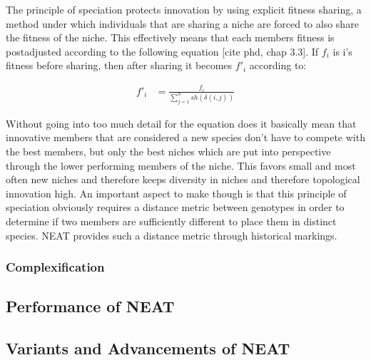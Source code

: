\documentclass[journal, a4paper]{IEEEtran}
\begin{document}
The principle of speciation protects innovation by using explicit fitness sharing, a method under which individuals that are sharing a niche are forced to also share the fitness of the niche. This effectively means that each members fitness is postadjusted according to the following equation [cite phd, chap 3.3]. If $f_i$ is i's fitness before sharing, then after sharing it becomes $f'_i$ according to:

\begin{align}
    f'_i &= \frac{f_i}{\sum_{j=1}^{n} sh(\delta(i,j))}
\end{align}

Without going into too much detail for the equation does it basically mean that innovative members that are considered a new species don't have to compete with the best members, but only the best niches which are put into perspective through the lower performing members of the niche. This favors small and most often new niches and therefore keeps diversity in niches and therefore topological innovation high. An important aspect to make though is that this principle of speciation obviously requires a distance metric between genotypes in order to determine if two members are sufficiently different to place them in distinct species. NEAT provides such a distance metric through historical markings.


\subsubsection{Complexification}





\subsection{Performance of NEAT} \label{sec:neat_performance}

\subsection{Variants and Advancements of NEAT}
\end{document}
